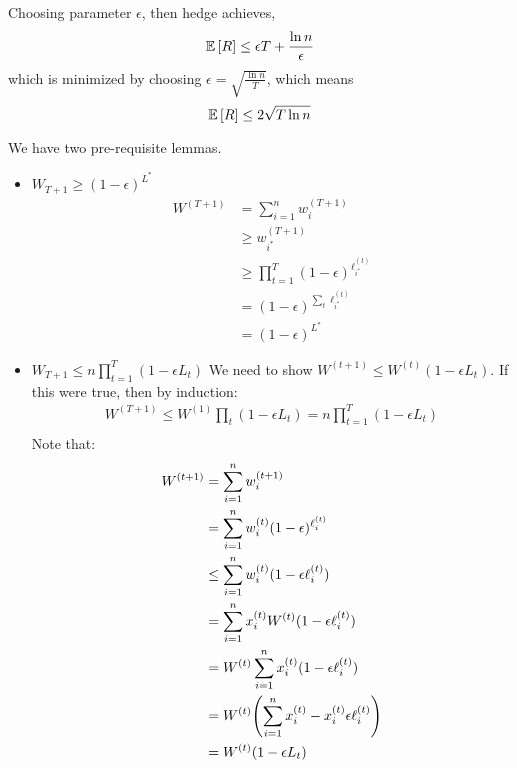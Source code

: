 \begin{theorem}
    Choosing parameter $\epsilon$, then hedge achieves,
    \[ \mathbb{E}\left[ R \right] \leq \epsilon T + \frac{\ln n}{\epsilon} \]
    which is minimized by choosing $\epsilon = \sqrt{\frac{\ln n}{T}}$, which means
    \[ \mathbb{E}\left[ R \right] \leq 2 \sqrt{T \ln n} \]

    \begin{proof*}
        We have two pre-requisite lemmas.
        \begin{itemize}
            \item $W_{T + 1} \geq (1 - \epsilon)^{L^*}$
            \begin{align*}
                W^{(T + 1)} &= \sum_{i = 1}^n w_i^{(T + 1)} \\
                &\geq w_{i^*}^{(T + 1)} \\
                &\geq \prod_{t = 1}^T (1 - \epsilon)^{\ell_{i^*}^{(t)}} \\
                &= (1 - \epsilon)^{\sum_t \ell_{i^*}^{(t)}} \\
                &= (1 - \epsilon)^{L^*}
            \end{align*}
            \item $W_{T + 1} \leq n \prod_{t = 1}^T (1 - \epsilon L_t)$
            We need to show $W^{(t + 1)} \leq W^{(t)} (1 - \epsilon L_t)$. If this were true, then by induction:
            \begin{align*}
                W^{(T + 1)} \leq W^{(1)} \prod_t (1 - \epsilon L_t) = n \prod_{t = 1}^T (1 - \epsilon L_t)\\
            \end{align*}
            Note that:
            \begin{align*}
                W^{(t + 1)} &= \sum_{i = 1}^n w_i^{(t + 1)} \\
                &= \sum_{i = 1}^n w_i^{(t)} (1 - \epsilon)^{\ell_i^{(t)}} \\
                &\leq \sum_{i = 1}^n w_i^{(t)} (1 - \epsilon \ell_i^{(t)}) \\
                &= \sum_{i = 1}^n x_i^{(t)} W^{(t)} (1 - \epsilon \ell_i^{(t)}) \\
                &= W^{(t)} \sum_{i = 1}^n x_i^{(t)} (1 - \epsilon \ell_i^{(t)}) \\
                &= W^{(t)} \qty(\sum_{i = 1}^n x_i^{(t)} - x_i^{(t)}\epsilon \ell_i^{(t)}) \\
                &= W^{(t)} (1 - \epsilon L_t) \\
            \end{align*}
        \end{itemize}


\end{proof*}
\end{theorem}
